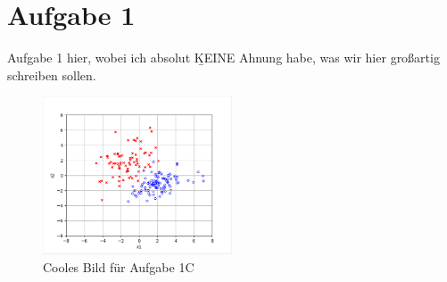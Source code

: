 \section{Aufgabe 1}
Aufgabe 1 hier, wobei ich absolut \b{KEINE} Ahnung habe, was wir hier großartig schreiben sollen.


\begin{figure}[h]
  \caption{Cooles Bild für Aufgabe 1C}
  \centering
  \includegraphics[width=0.5\textwidth]{../A1/aufgabe1C.PNG}
  \end{figure}